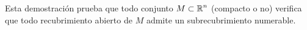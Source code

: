 \begin{observation}
Esta demostración prueba que todo conjunto $\displaystyle M \subset \mathbb{R}^{n} $ (compacto o no) verifica que todo recubrimiento abierto de $\displaystyle M $ admite un subrecubrimiento numerable. 
\end{observation}

